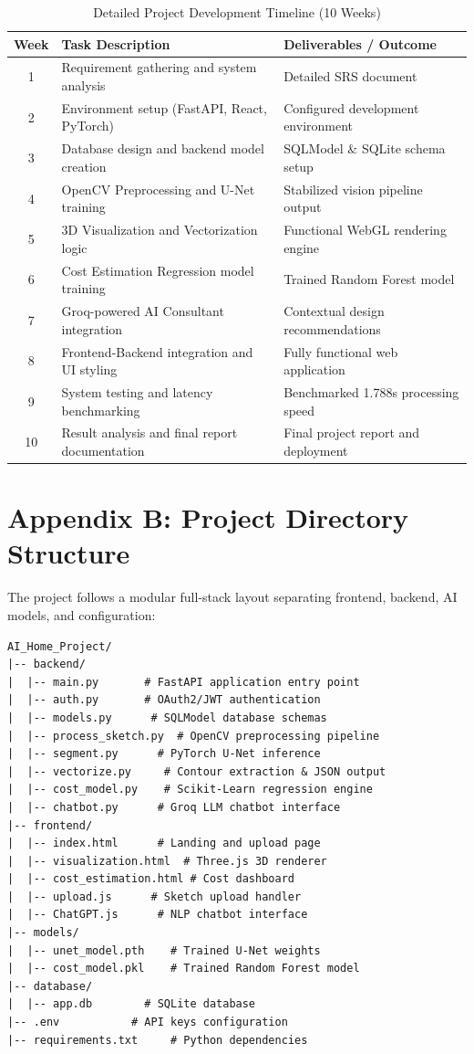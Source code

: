 \documentclass[12pt]{report}
\begin{document}
\begin{table}[H]
\centering
\caption{Detailed Project Development Timeline (10 Weeks)}
\label{tab:timeline}
\begin{tabular}{|c|l|l|}
\hline
\textbf{Week} & \textbf{Task Description} & \textbf{Deliverables / Outcome} \\
\hline
1 & Requirement gathering and system analysis & Detailed SRS document \\
\hline
2 & Environment setup (FastAPI, React, PyTorch) & Configured development environment \\
\hline
3 & Database design and backend model creation & SQLModel \& SQLite schema setup \\
\hline
4 & OpenCV Preprocessing and U-Net training & Stabilized vision pipeline output \\
\hline
5 & 3D Visualization and Vectorization logic & Functional WebGL rendering engine \\
\hline
6 & Cost Estimation Regression model training & Trained Random Forest model \\
\hline
7 & Groq-powered AI Consultant integration & Contextual design recommendations \\
\hline
8 & Frontend-Backend integration and UI styling & Fully functional web application \\
\hline
9 & System testing and latency benchmarking & Benchmarked 1.788s processing speed \\
\hline
10 & Result analysis and final report documentation & Final project report and deployment \\
\hline
\end{tabular}
\end{table}

\section*{Appendix B: Project Directory Structure}

The project follows a modular full-stack layout separating frontend, backend, AI models, and configuration:

\begin{verbatim}
AI_Home_Project/
|-- backend/
|  |-- main.py       # FastAPI application entry point
|  |-- auth.py       # OAuth2/JWT authentication
|  |-- models.py      # SQLModel database schemas
|  |-- process_sketch.py  # OpenCV preprocessing pipeline
|  |-- segment.py      # PyTorch U-Net inference
|  |-- vectorize.py     # Contour extraction & JSON output
|  |-- cost_model.py    # Scikit-Learn regression engine
|  |-- chatbot.py      # Groq LLM chatbot interface
|-- frontend/
|  |-- index.html      # Landing and upload page
|  |-- visualization.html  # Three.js 3D renderer
|  |-- cost_estimation.html # Cost dashboard
|  |-- upload.js      # Sketch upload handler
|  |-- ChatGPT.js      # NLP chatbot interface
|-- models/
|  |-- unet_model.pth    # Trained U-Net weights
|  |-- cost_model.pkl    # Trained Random Forest model
|-- database/
|  |-- app.db        # SQLite database
|-- .env           # API keys configuration
|-- requirements.txt     # Python dependencies
\end{verbatim}
\end{document}
